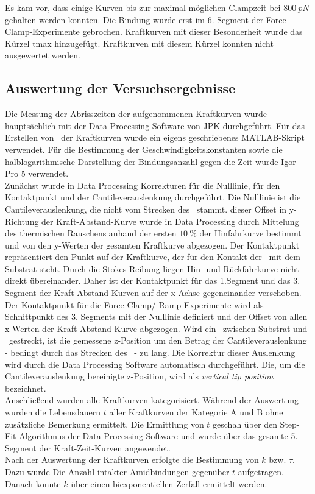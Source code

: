 Es kam vor, dass einige Kurven bis zur maximal möglichen Clampzeit bei $800~pN$ gehalten werden konnten. Die Bindung wurde erst im 6. Segment der Force-Clamp-Experimente gebrochen. Kraftkurven mit dieser Besonderheit wurde das Kürzel \ac{tmax} hinzugefügt. Kraftkurven mit diesem Kürzel konnten nicht ausgewertet werden.

\subsection{Auswertung der Versuchsergebnisse}
\label{subsec:auswertung_der_versuchsergebnisse}

Die Messung der Abrisszeiten der aufgenommenen Kraftkurven wurde hauptsächlich mit der Data Processing Software von JPK durchgeführt. Für das Erstellen von \abbn~der Kraftkurven wurde ein eigens geschriebenes MATLAB-Skript verwendet. Für die Bestimmung der Geschwindigkeitskonstanten sowie die halblogarithmische Darstellung der Bindungsanzahl gegen die Zeit wurde Igor Pro 5 verwendet.\\
Zunächst wurde in Data Processing Korrekturen für die Nulllinie, für den Kontaktpunkt und der Cantileverauslenkung durchgeführt. Die Nulllinie ist die Cantileverauslenkung, die nicht vom Strecken des \spacers~stammt. dieser Offset in y-Richtung der Kraft-Abstand-Kurve wurde in Data Processing durch Mittelung des thermischen Rauschens anhand der ersten $10~\%$ der Hinfahrkurve bestimmt und von den y-Werten der gesamten Kraftkurve abgezogen. Der Kontaktpunkt repräsentiert den Punkt auf der Kraftkurve, der für den Kontakt der \spitze~mit dem Substrat steht. Durch die Stokes-Reibung liegen Hin- und Rückfahrkurve nicht direkt übereinander. Daher ist der Kontaktpunkt für das 1.Segment und das 3. Segment der Kraft-Abstand-Kurven auf der x-Achse gegeneinander verschoben. Der Kontaktpunkt für die Force-Clamp/ Ramp-Experimente wird als Schnittpunkt des 3. Segments mit der Nulllinie definiert und der Offset von allen x-Werten der Kraft-Abstand-Kurve abgezogen. Wird ein \spacer~zwischen  Substrat und \spitze~gestreckt, ist die gemessene z-Position um den Betrag der Cantileverauslenkung - bedingt durch das Strecken des \spacers~- zu lang. Die Korrektur dieser Auslenkung wird durch die Data Processing Software automatisch durchgeführt. Die, um die Cantileverauslenkung bereinigte z-Position, wird als \textit{vertical tip position} bezeichnet.\\
Anschließend wurden alle Kraftkurven kategorisiert. Während der Auswertung wurden die Lebensdauern $t$ aller Kraftkurven der Kategorie A und B ohne zusätzliche Bemerkung ermittelt. Die Ermittlung von $t$ geschah über den Step-Fit-Algorithmus der Data Processing Software und wurde über das gesamte 5. Segment der Kraft-Zeit-Kurven angewendet.\\
Nach der Auswertung der Kraftkurven erfolgte die Bestimmung von $k$ bzw. $\tau$. Dazu wurde Die Anzahl intakter Amidbindungen gegenüber $t$ aufgetragen. Danach konnte $k$ über einen biexponentiellen Zerfall ermittelt werden.


